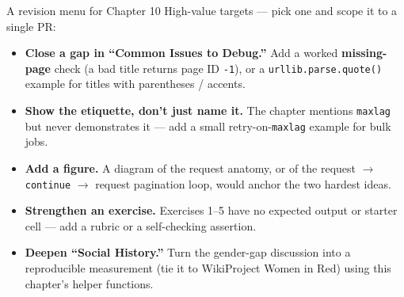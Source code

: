 \documentclass[9pt,aspectratio=169]{beamer}
\begin{document}
\begin{frame}{A revision menu for Chapter 10}
    High-value targets --- pick one and scope it to a single PR:
    \begin{itemize}
        \item \textbf{Close a gap in ``Common Issues to Debug.''} Add a worked \textbf{missing-page} check (a bad title returns page ID \texttt{-1}), or a \texttt{urllib.parse.quote()} example for titles with parentheses / accents.
        \item \textbf{Show the etiquette, don't just name it.} The chapter mentions \texttt{maxlag} but never demonstrates it --- add a small retry-on-\texttt{maxlag} example for bulk jobs.
        \item \textbf{Add a figure.} A diagram of the request anatomy, or of the request $\rightarrow$ \texttt{continue} $\rightarrow$ request pagination loop, would anchor the two hardest ideas.
        \item \textbf{Strengthen an exercise.} Exercises 1--5 have no expected output or starter cell --- add a rubric or a self-checking assertion.
        \item \textbf{Deepen ``Social History.''} Turn the gender-gap discussion into a reproducible measurement (tie it to WikiProject Women in Red) using this chapter's helper functions.
    \end{itemize}
\end{frame}
\end{document}
